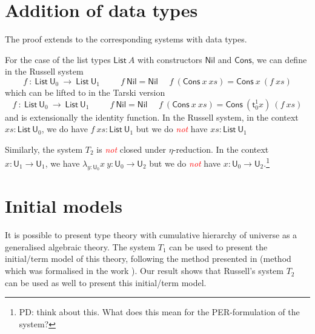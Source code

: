 \documentclass[11pt,a4paper]{article}
\theoremstyle{definition}
\def\UU{\mathsf{U}}
\def\List{\mathsf{List}}
\def\Cons{\mathsf{Cons}}
\def\Nil{\mathsf{Nil}}
\newcommand{\sT}{\mathsf{t}}
\newcommand{\EMP}[1]{\emph{\textcolor{red}{#1}}}
\begin{document}
\section{Addition of data types}

The proof extends to the corresponding systems with data types.

For the case of the list types $\List~A$ with constructors $\Nil$ and $\Cons$, we can define in the Russell system
$$
f~:~\List~\UU_0~\rightarrow~\List~\UU_1~~~~~~~~~~~
f~\Nil = \Nil~~~~~~f~(\Cons~x~xs) = \Cons~x~(f~xs)
$$
which can be lifted to in the Tarski version
$$
f~:~\List~\UU_0~\rightarrow~\List~\UU_1~~~~~~~~~~~
f~\Nil = \Nil~~~~~~f~(\Cons~x~xs) = \Cons~(\sT_0^1 x)~(f~xs)
$$
and is extensionally the identity function.
In the Russell system, in the context  $xs:\List~\UU_0$,
we do have $f~xs:\List~\UU_1$ but we do \EMP{not} have $xs:\List~\UU_1$

\medskip

     Similarly, the system $T_2$ is \EMP{not} closed under $\eta$-reduction. In the context
     $x:\UU_1\rightarrow\UU_1$, 
     we have $\lambda_{y:\UU_0}x~y:\UU_0\rightarrow\UU_2$ but we do \EMP{not} have
     $x:\UU_0\rightarrow\UU_2$.\footnote{PD: think about this. What does this mean for the PER-formulation of the system?}




\section{Initial models}

It is possible to present type theory with cumulative hierarchy of universe as a generalised algebraic theory.
The system $T_1$ can be used to present the initial/term model of this theory, following the method presented in \cite{Streicher:semtt}
(method which was formalised in the work \cite{brunerie:initiality}).
Our result shows that Russell's system $T_2$ can be used as well to present this initial/term model.





\end{document}
